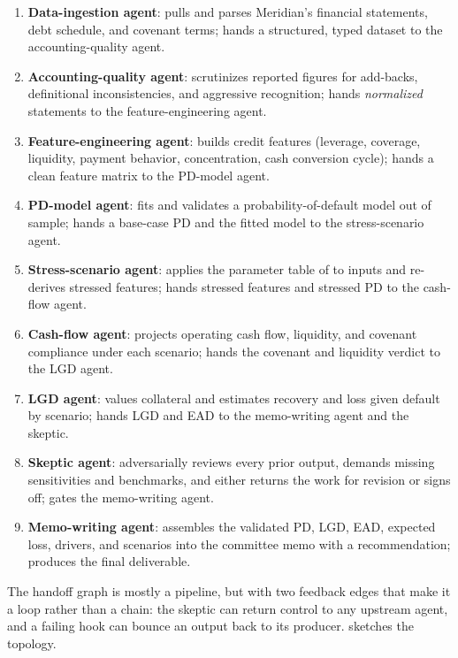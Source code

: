 \begin{enumerate}
\item \textbf{Data-ingestion agent}: pulls and parses Meridian's financial
statements, debt schedule, and covenant terms; hands a structured, typed dataset to
the accounting-quality agent.
\item \textbf{Accounting-quality agent}: scrutinizes reported figures for
add-backs, definitional inconsistencies, and aggressive recognition; hands
\emph{normalized} statements to the feature-engineering agent.
\item \textbf{Feature-engineering agent}: builds credit features (leverage,
coverage, liquidity, payment behavior, concentration, cash conversion cycle); hands
a clean feature matrix to the PD-model agent.
\item \textbf{PD-model agent}: fits and validates a probability-of-default model
out of sample; hands a base-case PD and the fitted model to the stress-scenario
agent.
\item \textbf{Stress-scenario agent}: applies the parameter table of
 to inputs and re-derives stressed features; hands stressed
features and stressed PD to the cash-flow agent.
\item \textbf{Cash-flow agent}: projects operating cash flow, liquidity, and
covenant compliance under each scenario; hands the covenant and liquidity verdict to
the LGD agent.
\item \textbf{LGD agent}: values collateral and estimates recovery and loss given
default by scenario; hands LGD and EAD to the memo-writing agent and the skeptic.
\item \textbf{Skeptic agent}: adversarially reviews every prior output, demands
missing sensitivities and benchmarks, and either returns the work for revision or
signs off; gates the memo-writing agent.
\item \textbf{Memo-writing agent}: assembles the validated PD, LGD, EAD, expected
loss, drivers, and scenarios into the committee memo with a recommendation; produces
the final deliverable.
\end{enumerate}

The handoff graph is mostly a pipeline, but with two feedback edges that make it a
loop rather than a chain: the skeptic can return control to any upstream agent, and
a failing hook can bounce an output back to its producer. 
sketches the topology.

